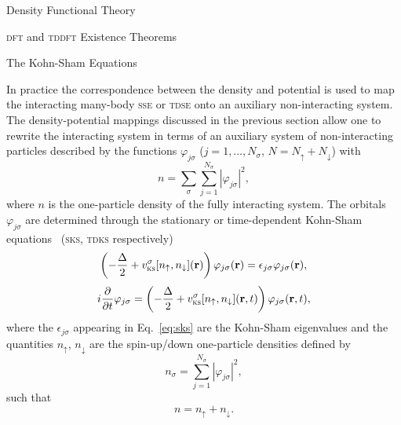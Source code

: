 \documentclass[a5paper, 9 pt]{extreport}
\begin{document}
\begin{chapter}{Density Functional Theory \label{chap:dft}}
\begin{section}{\textsc{dft} and \textsc{tddft} Existence Theorems \label{sec:dft}}
   \end{section}

   \begin{section}{The Kohn-Sham Equations \label{sec:ks}}

      In practice the correspondence between the density and potential is used to map the interacting
      many-body \textsc{sse} or \textsc{tdse} onto an auxiliary non-interacting system. The
      density-potential mappings discussed in the previous section allow one to rewrite the interacting
      system in terms of an auxiliary system of non-interacting particles described by the functions
      $\varphi_{j\sigma}$ ($j = 1, \dots, N_\sigma$, $N = N_\uparrow + N_\downarrow$) with
      \begin{equation} \label{eq:dendef2}
         n = \sum\limits_{\sigma} \sum\limits_{j = 1}^{N_\sigma}
                           \left| \varphi_{j\sigma} \right|^2,
      \end{equation}
      where $n$ is the one-particle density of the fully interacting system. The orbitals
      $\varphi_{j\sigma}$ are determined through the stationary or time-dependent Kohn-Sham
      equations~\cite{ks-eq, spin-dep1, spin-dep3, tdks} (\textsc{sks}, \textsc{tdks} respectively)
      \begin{equation} \label{eq:sks}
         \left( -\frac{\Delta}{2} + v^\sigma_\mathrm{\textsc{ks}}[n_\uparrow,
         n_\downarrow](\mathbf{r}) \right)
          \varphi_{j\sigma}(\mathbf{r}) = \epsilon_{j \sigma} \varphi_{j \sigma}(\mathbf{r}),
      \end{equation}
      \begin{equation} \label{eq:tdks}
         i \frac{\partial}{\partial t} \varphi_{j\sigma} =
            \left( -\frac{\Delta}{2} +
            v^\sigma_\mathrm{\textsc{ks}}[n_\uparrow, n_\downarrow](\mathbf{r},t)
            \right) \varphi_{j\sigma}(\mathbf{r},t),
      \end{equation}
      where the $\epsilon_{j \sigma}$ appearing in Eq.~\eqref{eq:sks} are the Kohn-Sham eigenvalues and
      the quantities $n_\uparrow$, $n_\downarrow$ are the spin-up/down one-particle densities defined by
      \begin{equation} \label{eq:spinden}
         n_\sigma = \sum\limits_{j=1}^{N_\sigma} \left| \varphi_{j\sigma} \right|^2,
      \end{equation}
      such that
      \begin{equation} \label{eq:denconstraint}
         n = n_\uparrow + n_\downarrow.
      \end{equation}


\end{section}
\end{chapter}
\end{document}
